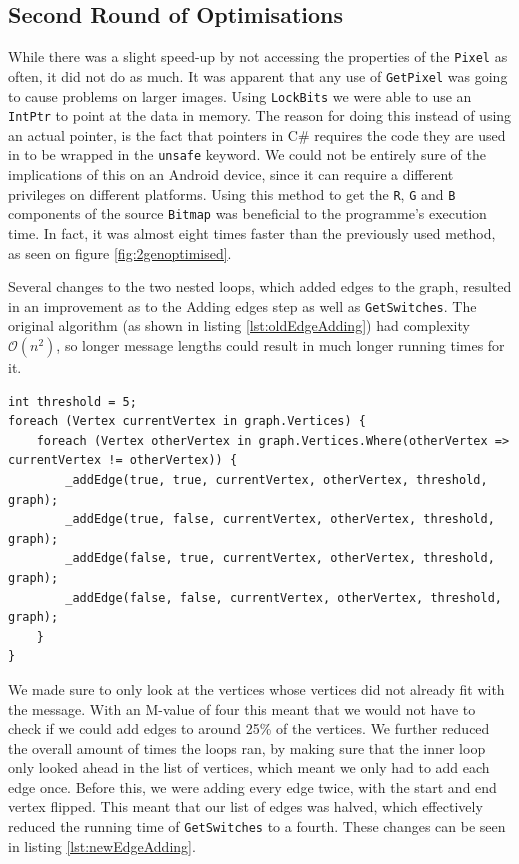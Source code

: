 \subsection{Second Round of Optimisations}
While there was a slight speed-up by not accessing the properties of the \lstinline|Pixel| as often, it did not do as much.
It was apparent that any use of \lstinline|GetPixel| was going to cause problems on larger images.
Using \lstinline|LockBits| we were able to use an \lstinline|IntPtr| to point at the data in memory. \citep{MSDNIntPtr}
The reason for doing this instead of using an actual pointer, is the fact that pointers in C\# requires the code they are used in to be wrapped in the \lstinline|unsafe| keyword. 
We could not be entirely sure of the implications of this on an Android device, since it can require a different privileges on different platforms.
Using this method to get the \lstinline|R|, \lstinline|G| and \lstinline|B| components of the source \lstinline|Bitmap| was beneficial to the programme's execution time.
In fact, it was almost eight times faster than the previously used method, as seen on figure \ref{fig:2genoptimised}.

Several changes to the two nested loops, which added edges to the graph, resulted in an improvement as to the Adding edges step as well as \lstinline|GetSwitches|.
The original algorithm (as shown in listing \ref{lst:oldEdgeAdding}) had complexity $\mathcal{O}(n^2)$, so longer message lengths could result in much longer running times for it.

\begin{lstlisting}[firstnumber=459,label=lst:oldEdgeAdding, caption={Original algorithm for adding edges to the graph. From first round JPEGImage.cs.}]
int threshold = 5;
foreach (Vertex currentVertex in graph.Vertices) {
    foreach (Vertex otherVertex in graph.Vertices.Where(otherVertex => currentVertex != otherVertex)) {
        _addEdge(true, true, currentVertex, otherVertex, threshold, graph);
        _addEdge(true, false, currentVertex, otherVertex, threshold, graph);
        _addEdge(false, true, currentVertex, otherVertex, threshold, graph);
        _addEdge(false, false, currentVertex, otherVertex, threshold, graph);
    }
}
\end{lstlisting}

We made sure to only look at the vertices whose vertices did not already fit with the message.
With an M-value of four this meant that we would not have to check if we could add edges to around 25\% of the vertices.
We further reduced the overall amount of times the loops ran, by making sure that the inner loop only looked ahead in the list of vertices, which meant we only had to add each edge once.
Before this, we were adding every edge twice, with the start and end vertex flipped.
This meant that our list of edges was halved, which effectively reduced the running time of \lstinline|GetSwitches| to a fourth.
These changes can be seen in listing \ref{lst:newEdgeAdding}.

